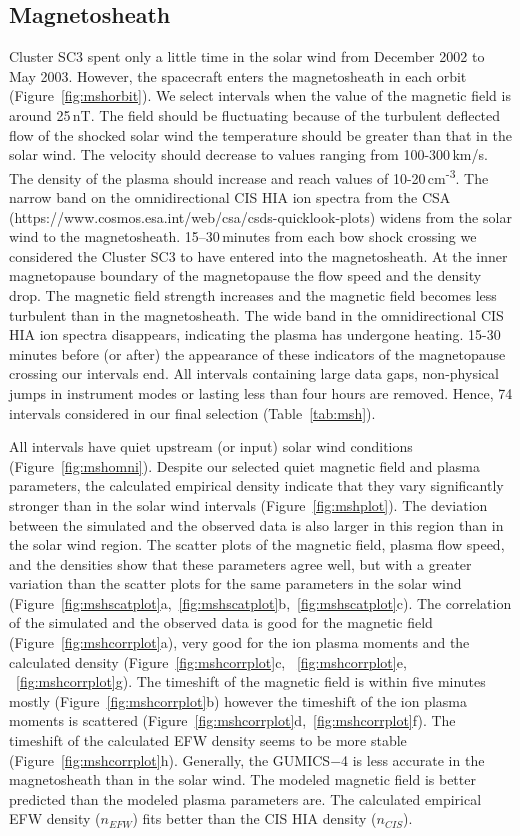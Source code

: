 \documentclass[draft]{agujournal2019}
\begin{document}
\subsection{Magnetosheath}
\label{sec:msh}

Cluster SC3 spent only a little time in the solar wind from December 2002 to May 2003. However, the spacecraft enters the magnetosheath in each orbit (Figure~\ref{fig:mshorbit}). We select intervals when the value of the magnetic field is around 25\,nT. The field should be fluctuating because of the turbulent deflected flow of the shocked solar wind the temperature should be greater than that in the solar wind. The velocity should decrease to values ranging from 100-300\,km/s. The density of the plasma should increase and reach values of 10-20\,cm\textsuperscript{-3}. The narrow band on the omnidirectional CIS HIA ion spectra from the CSA (https://www.cosmos.esa.int/web/csa/csds-quicklook-plots) widens from the solar wind to the magnetosheath. 15--30\,minutes from each bow shock crossing we considered the Cluster SC3 to have entered into the magnetosheath. At the inner magnetopause boundary of the magnetopause the flow speed and the density drop. The magnetic field strength increases and the magnetic field becomes less turbulent than in the magnetosheath. The wide band in the omnidirectional CIS HIA ion spectra disappears, indicating the plasma has undergone heating. 15-30 minutes before (or after) the appearance of these indicators of the magnetopause crossing our intervals end. All intervals containing large data gaps, non-physical jumps in instrument modes or lasting less than four hours are removed. Hence, 74 intervals considered in our final selection (Table~\ref{tab:msh}). 

All intervals have quiet upstream (or input) solar wind conditions (Figure~\ref{fig:mshomni}). Despite our selected quiet magnetic field and plasma parameters, the calculated empirical density indicate that they vary significantly stronger than in the solar wind intervals (Figure~\ref{fig:mshplot}). The deviation between the simulated and the observed data is also larger in this region than in the solar wind region. The scatter plots of the magnetic field, plasma flow speed, and the densities show that these parameters agree well, but with a greater variation than the scatter plots for the same parameters in the solar wind (Figure~\ref{fig:mshscatplot}a,~\ref{fig:mshscatplot}b,~\ref{fig:mshscatplot}c). The correlation of the simulated and the observed data is good for the magnetic field (Figure~\ref{fig:mshcorrplot}a), very good for the ion plasma moments and the calculated density (Figure~\ref{fig:mshcorrplot}c, ~\ref{fig:mshcorrplot}e, ~\ref{fig:mshcorrplot}g). The timeshift of the magnetic field is within five minutes mostly (Figure~\ref{fig:mshcorrplot}b) however the timeshift of the ion plasma moments is scattered (Figure~\ref{fig:mshcorrplot}d,~\ref{fig:mshcorrplot}f). The timeshift of the calculated EFW density seems to be more stable (Figure~\ref{fig:mshcorrplot}h). Generally, the GUMICS$-$4 is less accurate in the magnetosheath than in the solar wind. The modeled magnetic field is better predicted than the modeled plasma parameters are. The calculated empirical EFW density ($n_{EFW}$) fits better than the CIS HIA density ($n_{CIS}$).
\end{document}
